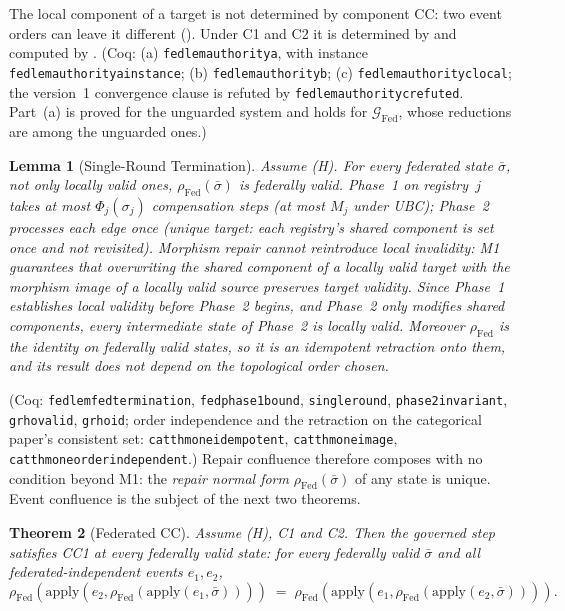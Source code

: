 \documentclass[11pt,a4paper]{article}
\theoremstyle{plain}
\newtheorem{theorem}{Theorem}[section]
\newtheorem{lemma}[theorem]{Lemma}
\theoremstyle{definition}
\theoremstyle{remark}
\newcommand{\apply}{\mathrm{apply}}
\newcommand{\Fed}{\mathrm{Fed}}
\renewcommand{\_}{\textunderscore\allowbreak}
\begin{document}
The local component of a target is not determined by component CC: two event
orders can leave it different ().  Under C1 and C2 it is
determined by  and computed by .
(Coq: (a) \texttt{fed\_lem\_authority\_a}, with instance
\texttt{fed\_lem\_authority\_a\_instance}; (b) \texttt{fed\_lem\_authority\_b};
(c) \texttt{fed\_lem\_authority\_c\_local}; the version~1 convergence clause is
refuted by \texttt{fed\_lem\_authority\_c\_refuted}.  Part~(a) is proved for
the unguarded system and holds for $\mathcal{G}_\Fed$, whose reductions are
among the unguarded ones.)

\begin{lemma}[Single-Round Termination]
\label{lem:fed-termination}
Assume (H).  For every federated state $\bar{\sigma}$, not only locally valid
ones, $\rho_\Fed(\bar{\sigma})$ is federally valid.  Phase~1 on registry~$j$
takes at most $\Phi_j(\sigma_j)$ compensation steps (at most $M_j$ under UBC);
Phase~2 processes each edge once (unique target: each registry's shared
component is set once and not revisited).  Morphism repair cannot reintroduce
local invalidity: M1 guarantees that overwriting the shared component of a
locally valid target with the morphism image of a locally valid source
preserves target validity.  Since Phase~1 establishes local validity before
Phase~2 begins, and Phase~2 only modifies shared components, every
intermediate state of Phase~2 is locally valid.  Moreover $\rho_\Fed$ is the
identity on federally valid states, so it is an idempotent retraction onto
them, and its result does not depend on the topological order chosen.
\end{lemma}

(Coq: \texttt{fed\_lem\_fed\_termination}, \texttt{fed\_phase1\_bound},
\texttt{single\_round}, \texttt{phase2\_invariant}, \texttt{grho\_valid},
\texttt{grho\_id}; order independence and the retraction on the categorical
paper's consistent set: \texttt{cat\_thm\_one\_idempotent},
\texttt{cat\_thm\_one\_image}, \texttt{cat\_thm\_one\_order\_independent}.)
Repair confluence therefore composes with no condition beyond M1: the
\emph{repair normal form} $\rho_\Fed(\bar{\sigma})$ of any state is unique.
Event confluence is the subject of the next two theorems.

\begin{theorem}[Federated CC]
\label{thm:fed-cc}
Assume (H), C1 and C2.  Then the governed step satisfies CC1 at every
federally valid state: for every federally valid $\bar{\sigma}$ and all
federated-independent events $e_1, e_2$,
\[
\rho_\Fed(\apply(e_2, \rho_\Fed(\apply(e_1, \bar{\sigma}))))
\;=\;
\rho_\Fed(\apply(e_1, \rho_\Fed(\apply(e_2, \bar{\sigma})))).
\]
\end{theorem}
\end{document}
